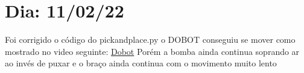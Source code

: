 \chapter{Dia: 11/02/22}
\label{chap:11-02-22}

Foi corrigido o código do pick\underline{\space}and\underline{\space}place.py o DOBOT conseguiu se mover como mostrado no video seguinte: \href{https://youtu.be/nkaut31VhHA}{Dobot} 
Porém a bomba ainda continua soprando ar ao invés de puxar e o braço ainda continua com o movimento muito lento
